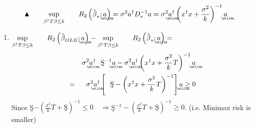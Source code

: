 \documentclass{article}
\begin{document}
\begin{equation}
\blacktriangle \qquad \underset{\beta ^{\dagger }T\beta \leq k}{\sup }\qquad
R_{2}\left( \hat{\beta}_{\ast };%
\underaccent{\wtilde}{a}%
\right) =\sigma ^{2}a^{\dagger }D_{\ast }^{-1}a=\sigma ^{2}%
\underaccent{\wtilde}{a}%
^{\dagger }\left( x^{\dagger }x+\frac{\sigma ^{2}}{k}\right) ^{-1}%
\underaccent{\wtilde}{a}%
\end{equation}

\bigskip

\begin{enumerate}
\item $\underset{\beta ^{\dagger }T\beta \leq k}{\sup }\qquad R_{2}\left( 
\hat{\beta}_{OLE};%
\underaccent{\wtilde}{a}%
\right) -\underset{\beta ^{\dagger }T\beta \leq k}{\sup }\qquad R_{2}\left( 
\hat{\beta}_{\ast };%
\underaccent{\wtilde}{a}%
\right) =$%
\begin{eqnarray*}
&&\sigma ^{2}%
\underaccent{\wtilde}{a}%
^{\dagger }\text{\c{S}}^{-1}%
\underaccent{\wtilde}{a}%
-\sigma ^{2}%
\underaccent{\wtilde}{a}%
^{\dagger }\left( x^{\dagger }x+\frac{\sigma ^{2}}{k}T\right) ^{-1}%
\underaccent{\wtilde}{a}
\\
&=&\sigma ^{2}%
\underaccent{\wtilde}{a}%
^{\dagger }\left[ \text{\c{S}}-\left( x^{\dagger }x+\frac{\sigma ^{2}}{k}%
T\right) ^{-1}\right] 
\underaccent{\wtilde}{a}%
\geq 0
\end{eqnarray*}%
Since \c{S}$-\left( \frac{\sigma ^{2}}{k}T+\text{\c{S}}\right) ^{-1}\leq
0\quad \Rightarrow $\c{S}$^{-1}-\left( \frac{\sigma ^{2}}{k}T+\text{\c{S}}%
\right) ^{-1}\geq 0$. (i.e. Minimax risk is smaller)


\end{enumerate}
\end{document}
